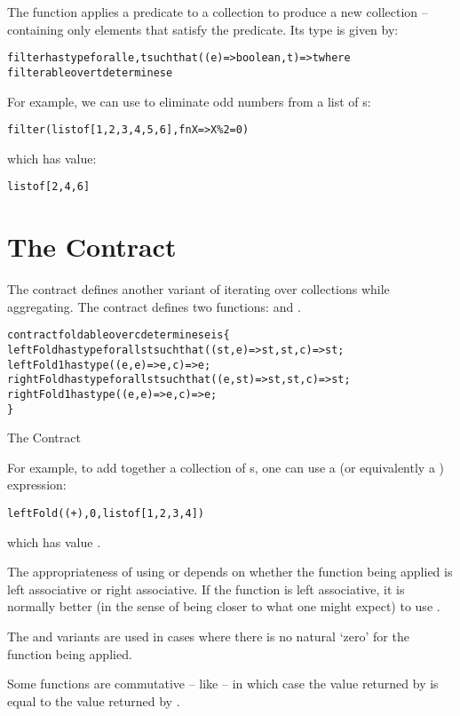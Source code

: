 The  function applies a predicate to a collection to produce a new collection -- containing only elements that satisfy the predicate. Its type is given by:
\begin{alltt}
filter has type for all e,t such that ((e)=>boolean,t) => t where
  filterable over t determines e
\end{alltt}
For example, we can use  to eliminate odd numbers from a list of s:
\begin{alltt}
filter(list of [1,2,3,4,5,6],fn X=>X\%2=0)
\end{alltt}
which has value:
\begin{alltt}
list of [2,4,6]
\end{alltt}

\section{The  Contract}
\label{foldableContract}
The  contract defines another variant of iterating over collections while aggregating. The  contract defines two functions:  and .

\begin{program}[H]
\begin{alltt}
contract foldable over c determines e is \{
  leftFold has type for all st such that ((st,e)=>st,st,c)=>st;
  leftFold1 has type ((e,e)=>e,c) => e;
  rightFold has type for all st such that ((e,st)=>st,st,c)=>st;
  rightFold1 has type ((e,e)=>e,c)=>e;
\}
\end{alltt}
\caption{The  Contract\label{foldableContractProg}}
\end{program}

For example, to add together a collection of s, one can use a  (or equivalently a ) expression:
\begin{alltt}
leftFold((+),0,list of [1, 2, 3, 4])
\end{alltt}
which has value .

\begin{aside}
The appropriateness of using  or  depends on whether the function being applied is left associative or right associative. If the function is left associative, it is normally better (in the sense of being closer to what one might expect) to use .

The  and  variants are used in cases where there is no natural `zero' for the function being applied.

Some functions are commutative -- like \q{(+)} -- in which case the value returned by  is equal to the value returned by .
\end{aside}

